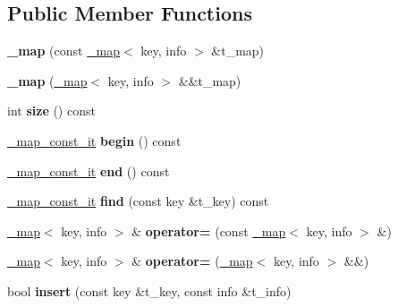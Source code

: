 \subsection*{Public Member Functions}
\begin{DoxyCompactItemize}
\item 
\mbox{\label{class__map_a04c5724f711465c8d3bf6990d74bd492}} 
{\bfseries \+\_\+map} (const \mbox{\hyperlink{class__map}{\+\_\+map}}$<$ key, info $>$ \&t\+\_\+map)
\item 
\mbox{\label{class__map_af722a2df39f44316c64978d9e47dce69}} 
{\bfseries \+\_\+map} (\mbox{\hyperlink{class__map}{\+\_\+map}}$<$ key, info $>$ \&\&t\+\_\+map)
\item 
\mbox{\label{class__map_a4420250a8cf10c4377bdc16d9032798f}} 
int {\bfseries size} () const
\item 
\mbox{\label{class__map_a8108e922db8f0075fe9e97001758b064}} 
\mbox{\hyperlink{class__map__iterator}{\+\_\+map\+\_\+const\+\_\+it}} {\bfseries begin} () const
\item 
\mbox{\label{class__map_a0f1ec640810a3367d43dde442f970a89}} 
\mbox{\hyperlink{class__map__iterator}{\+\_\+map\+\_\+const\+\_\+it}} {\bfseries end} () const
\item 
\mbox{\label{class__map_a32fd8e9ce4e8837fb8d998f4411cc684}} 
\mbox{\hyperlink{class__map__iterator}{\+\_\+map\+\_\+const\+\_\+it}} {\bfseries find} (const key \&t\+\_\+key) const
\item 
\mbox{\label{class__map_aac7b4cd019ca406942f7c167606b9d4b}} 
\mbox{\hyperlink{class__map}{\+\_\+map}}$<$ key, info $>$ \& {\bfseries operator=} (const \mbox{\hyperlink{class__map}{\+\_\+map}}$<$ key, info $>$ \&)
\item 
\mbox{\label{class__map_a9d59bf5998f4e9a493b64cdee14c4706}} 
\mbox{\hyperlink{class__map}{\+\_\+map}}$<$ key, info $>$ \& {\bfseries operator=} (\mbox{\hyperlink{class__map}{\+\_\+map}}$<$ key, info $>$ \&\&)
\item 
\mbox{\label{class__map_a6b4fc9677daeb68f440af4269fa6ede9}} 
bool {\bfseries insert} (const key \&t\+\_\+key, const info \&t\+\_\+info)

\end{DoxyCompactItemize}
